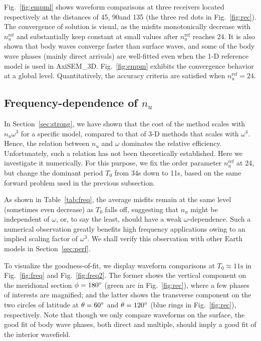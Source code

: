 \documentclass[extra,referee]{gji}
\begin{document}
Fig.~\ref{fig:empml} shows waveform comparisons at three receivers located
respectively at the distances of 45\degr, 90\degr and 135\degr 
(the three red dots in Fig.~\ref{fig:rec}). The convergence of solution 
is visual, as the misfits monotonically decrease with $n_u^\text{ref}$ 
and substantially keep constant at small values after $n_u^\text{ref}$
reaches 24. It is also shown that body waves converge faster than 
surface waves, and some of the body wave phases (mainly direct arrivals) 
are well-fitted even when the 1-D reference model is used in AxiSEM\_3D. 
Fig.~\ref{fig:empm} exhibits the convergence behavior at a global level.
Quantitatively, the accuracy criteria are satisfied when $n_u^\text{ref}=24$.



\subsection{Frequency-dependence of $n_u$}
\label{sec:benfreq}
In Section~\ref{sec:strong}, we have shown that the cost of the method
scales with $n_u\omega^3$ for a specific model, compared to that of 3-D 
methods that scales with $\omega^4$.
Hence, the relation between $n_u$ and $\omega$ dominates the 
relative efficiency. 
Unfortunately, such a relation has not been theoretically established. 
Here we investigate it numerically. 
For this purpose, we fix the order parameter $n_u^\text{ref}$ at 24, but 
change the dominant period $T_0$ from 34s down to 11s, based on the same 
forward problem used in the previous subsection. 

As shown in Table~\ref{tab:freq}, the average misfits remain at the same 
level (sometimes even decrease) as $T_0$ falls off, 
suggesting that $n_u$ might be independent of
$\omega$, or, to say the least, should have a weak $\omega$-dependence. 
Such a numerical observation greatly benefits high frequency applications
owing to an implied scaling factor of $\omega^3$. 
We shall verify this observation with other Earth models 
in Section~\ref{sec:perf}. 

To visualize the goodness-of-fit, we display waveform comparisons
at $T_0\approx11\text{s}$ in Fig.~\ref{fig:freq} and Fig.~\ref{fig:freq2}. 
The former shows the vertical component on the meridional section $\phi=180\hbox{$^\circ$}$
(green arc in Fig.~\ref{fig:rec}),
where a few phases of interests are magnified; 
and the latter shows the transverse component on the two 
circles of latitude at $\theta=60\hbox{$^\circ$}$ and $\theta=120\hbox{$^\circ$}$
(blue rings in Fig.~\ref{fig:rec}), respectively. 
Note that though we only compare waveforms on the surface,
the good fit of body wave phases, both direct and multiple, should imply 
a good fit of the interior wavefield. 
\end{document}
